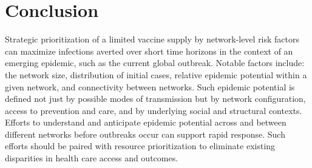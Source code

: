 \section{Conclusion}
Strategic prioritization of a limited vaccine supply by network-level risk factors
can maximize infections averted over short time horizons
in the context of an emerging epidemic, such as the current global \MPXV outbreak.
Notable factors include:
the network size,
distribution of initial cases,
relative epidemic potential within a given network, and
connectivity between networks.
Such epidemic potential is defined not just by possible modes of transmission but by
network configuration, access to prevention and care,
and by underlying social and structural contexts.
Efforts to understand and anticipate epidemic potential across and between different networks
before outbreaks occur can support rapid response.
Such efforts should be paired with resource prioritization
to eliminate existing disparities in health care access and outcomes.
